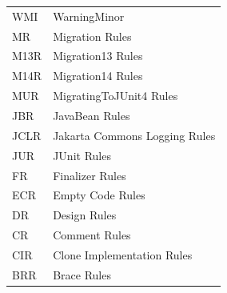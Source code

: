\begin{table}[H]
{\begin{tabular}{ll}
WMI                  & WarningMinor                                              \\
MR                   & Migration Rules                                           \\
M13R                 & Migration13 Rules                                         \\
M14R                 & Migration14 Rules                                        \\
MUR                  & MigratingToJUnit4 Rules                                   \\
JBR                  & JavaBean Rules                                            \\
JCLR                 & Jakarta Commons Logging Rules                             \\
JUR                  & JUnit Rules                                              \\
FR                   & Finalizer Rules                                           \\
ECR                  & Empty Code Rules                                          \\
DR                   & Design Rules                                              \\
CR                   & Comment Rules                                             \\
CIR                  & Clone Implementation Rules                               \\
BRR                  & Brace Rules   \\
\bottomrule
\end{tabular}

\label{table:smell_metrics}
}
\end{table}